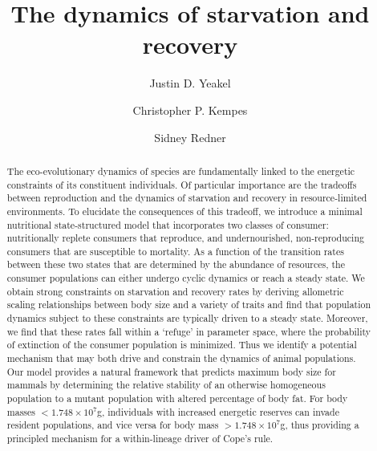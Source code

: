 \documentclass[twocolumn,preprintnumbers,amsmath,amssymb,superscriptaddress]{revtex4}
\begin{document}
\author{Justin D. Yeakel} 

\author{Christopher P. Kempes} 

\author{Sidney Redner} 

\title{The dynamics of starvation and recovery}%



\begin{abstract} %
The eco-evolutionary dynamics of species are fundamentally linked to the energetic constraints of its constituent individuals. Of particular importance are the tradeoffs between reproduction and the dynamics of starvation and recovery in resource-limited environments. To elucidate the consequences of this tradeoff, we introduce a minimal nutritional state-structured model that incorporates two classes of consumer: nutritionally replete consumers that reproduce, and undernourished, non-reproducing consumers that are susceptible to mortality. As a function of the transition rates between these two states that are determined by the abundance of resources, the consumer populations can either undergo cyclic dynamics or reach a steady state. We obtain strong constraints on starvation and recovery rates by deriving allometric scaling relationships between body size and a variety of traits and find that population dynamics subject to these constraints are typically driven to a steady state. Moreover, we find that these rates fall within a `refuge' in parameter space, where the probability of extinction of the consumer population is minimized. Thus we identify a potential mechanism that may both drive and constrain the dynamics of animal populations. Our model provides a natural framework that predicts maximum body size for mammals by determining the relative stability of an otherwise homogeneous population to a mutant population with altered percentage of body fat. For body masses $< 1.748\times10^7$g, individuals with increased energetic reserves can invade resident populations, and vice versa for body mass $> 1.748\times10^7$g, thus providing a principled mechanism for a within-lineage driver of Cope's rule.
\end{abstract}

\maketitle
\end{document}
